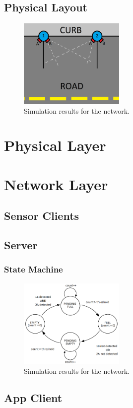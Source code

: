 \documentclass[conference]{IEEEtran}
\begin{document}
\subsection{Physical Layout}
\begin{figure}[h]
\centering
\includegraphics[width=2.0in]{parkingspace.png}
\caption{Simulation results for the network.}
\label{fig_curb}
\end{figure}

\section{Physical Layer}

\section{Network Layer}
\subsection{Sensor Clients}
\subsection{Server}
\subsubsection{State Machine}
\begin{figure}[h]
	\centering
	\includegraphics[width=2.0in]{FSM.png}
	\caption{Simulation results for the network.}
	\label{fig_fsm}
\end{figure}
\subsection{App Client}
\end{document}
